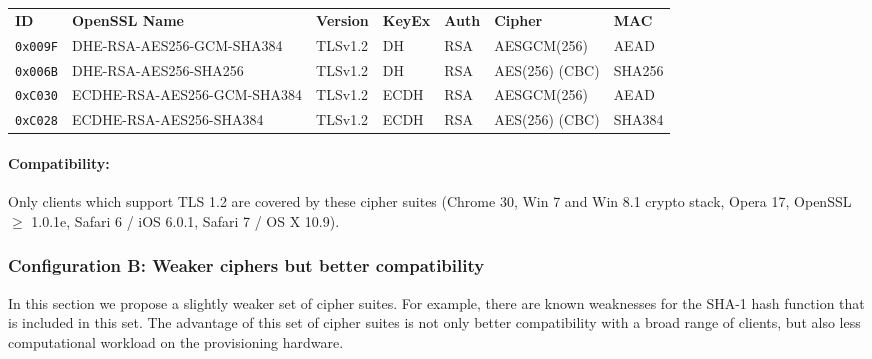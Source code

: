 %



\begin{center}

\begin{tabular}{lllllll}
\toprule
\textbf{ID}   & \textbf{OpenSSL Name}       & \textbf{Version} & \textbf{KeyEx} & \textbf{Auth} & \textbf{Cipher} & \textbf{MAC}\\\cmidrule(lr){1-7}
\verb|0x009F| & DHE-RSA-AES256-GCM-SHA384   & TLSv1.2          & DH             &  RSA          & AESGCM(256)     & AEAD         \\
\verb|0x006B| & DHE-RSA-AES256-SHA256       & TLSv1.2          & DH             &  RSA          & AES(256) (CBC)  & SHA256       \\
\verb|0xC030| & ECDHE-RSA-AES256-GCM-SHA384 & TLSv1.2          & ECDH           &  RSA          & AESGCM(256)     & AEAD         \\
\verb|0xC028| & ECDHE-RSA-AES256-SHA384     & TLSv1.2          & ECDH           &  RSA          & AES(256) (CBC)  & SHA384       \\
\bottomrule
\end{tabular}
\end{center}


\paragraph*{Compatibility:}

Only clients which support TLS 1.2 are covered by these cipher suites (Chrome 30,
Win 7 and Win 8.1 crypto stack, Opera 17, OpenSSL $\ge$ 1.0.1e, Safari 6 / iOS
6.0.1, Safari 7 / OS X 10.9).



\subsubsection{Configuration B: Weaker ciphers but better compatibility}

In this section we propose a slightly weaker set of cipher suites.  For
example, there are known weaknesses for the SHA-1 hash function that is
included in this set.  The advantage of this set of cipher suites is not only
better compatibility with a broad range of clients, but also less computational
workload on the provisioning hardware.


